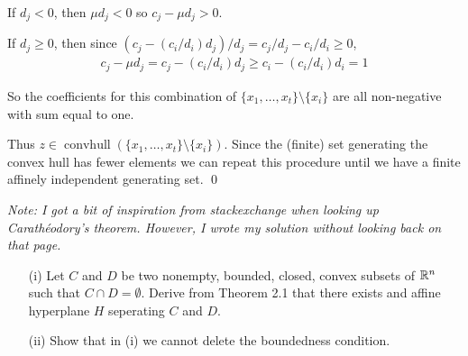 \documentclass[10pt]{article}
\newcommand{\convhull}{\operatorname{convhull}}
\begin{document}
\begin{solution}
If \( d_j < 0 \), then \( \mu d_j < 0 \) so \( c_j - \mu d_j > 0 \).

If \( d_j \geq 0 \), then since \( (c_j-(c_i/d_i)d_j)/d_j = c_j/d_j - c_i/d_i \geq 0 \),
\begin{align*}
    c_j - \mu d_j = c_j - (c_i/d_i )d_j \geq c_i - (c_i/d_i) d_i = 1  
\end{align*}

So the coefficients for this combination of \( \{x_1, \ldots, x_t\}\setminus \{x_i\} \) are all non-negative with sum equal to one.

Thus \( z\in\convhull(\{x_1, \ldots, x_t \}\setminus\{x_i\}) \). Since the (finite) set generating the convex hull has fewer elements we can repeat this procedure until we have a finite affinely independent generating set. \qed

\textit{Note: I got a bit of inspiration from stackexchange when looking up Carath\'eodory's theorem. However, I wrote my solution without looking back on that page.}

\end{solution}

\begin{problem}[Exercise 2.5]
    \begin{enumerate}
        \item[(i)] Let \( C \) and \( D \) be two nonempty, bounded, closed, convex subsets of \( \mathbb{R}^n \) such that \( C\cap D = \emptyset \). Derive from Theorem 2.1 that there exists and affine hyperplane \( H \) seperating \( C \) and \( D \). 
        \item[(ii)] Show that in (i) we cannot delete the boundedness condition.
    \end{enumerate}
\end{problem}
\end{document}
